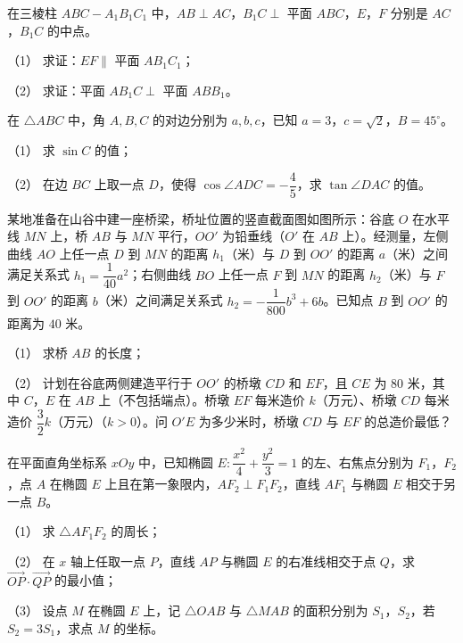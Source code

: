\Needspace{0.4\textheight}
\begin{question}
在三棱柱 $ABC-A_1B_1C_1$ 中，$AB\perp AC$，$B_1C\perp$ 平面 $ABC$，$E$，$F$ 分别是 $AC$，$B_1C$ 的中点。

（1） 求证：$EF\parallel$ 平面 $AB_1C_1$；

（2） 求证：平面 $AB_1C\perp$ 平面 $ABB_1$。
\nopagebreak[4]
\begin{center}\end{center}
\nopagebreak[4]
\Needspace{0.4\textheight}
\end{question}
\begin{question}
在 $\triangle ABC$ 中，角 $A,B,C$ 的对边分别为 $a,b,c$，已知 $a=3$，$c=\sqrt2$，$B=45^\circ$。

（1） 求 $\sin C$ 的值；

（2） 在边 $BC$ 上取一点 $D$，使得 $\cos\angle ADC=-\dfrac45$，求 $\tan\angle DAC$ 的值。
\nopagebreak[4]
\begin{center}\end{center}
\nopagebreak[4]
\Needspace{0.4\textheight}
\end{question}
\begin{question}
某地准备在山谷中建一座桥梁，桥址位置的竖直截面图如图所示：谷底 $O$ 在水平线 $MN$ 上，桥 $AB$ 与 $MN$ 平行，$OO'$ 为铅垂线（$O'$ 在 $AB$ 上）。经测量，左侧曲线 $AO$ 上任一点 $D$ 到 $MN$ 的距离 $h_1$（米）与 $D$ 到 $OO'$ 的距离 $a$（米）之间满足关系式 $h_1=\dfrac1{40}a^2$；右侧曲线 $BO$ 上任一点 $F$ 到 $MN$ 的距离 $h_2$（米）与 $F$ 到 $OO'$ 的距离 $b$（米）之间满足关系式 $h_2=-\dfrac1{800}b^3+6b$。已知点 $B$ 到 $OO'$ 的距离为 $40$ 米。

（1） 求桥 $AB$ 的长度；

（2） 计划在谷底两侧建造平行于 $OO'$ 的桥墩 $CD$ 和 $EF$，且 $CE$ 为 $80$ 米，其中 $C$，$E$ 在 $AB$ 上（不包括端点）。桥墩 $EF$ 每米造价 $k$（万元）、桥墩 $CD$ 每米造价 $\dfrac32k$（万元）（$k>0$）。问 $O'E$ 为多少米时，桥墩 $CD$ 与 $EF$ 的总造价最低？
\nopagebreak[4]
\begin{center}\end{center}
\nopagebreak[4]
\end{question}
\begin{question}
在平面直角坐标系 $xOy$ 中，已知椭圆 $E:\dfrac{x^2}4+\dfrac{y^2}3=1$ 的左、右焦点分别为 $F_1$，$F_2$，点 $A$ 在椭圆 $E$ 上且在第一象限内，$AF_2\perp F_1F_2$，直线 $AF_1$ 与椭圆 $E$ 相交于另一点 $B$。

（1） 求 $\triangle AF_1F_2$ 的周长；

（2） 在 $x$ 轴上任取一点 $P$，直线 $AP$ 与椭圆 $E$ 的右准线相交于点 $Q$，求 $\overrightarrow{OP}\cdot\overrightarrow{QP}$ 的最小值；

（3） 设点 $M$ 在椭圆 $E$ 上，记 $\triangle OAB$ 与 $\triangle MAB$ 的面积分别为 $S_1$，$S_2$，若 $S_2=3S_1$，求点 $M$ 的坐标。

\end{question}
